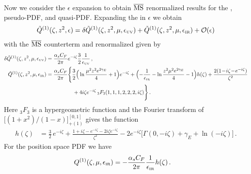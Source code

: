 \begin{widetext}
Now we consider the $\epsilon$ expansion to obtain $\overline{\rm MS}$ renormalized results for the \spcorr, pseudo-PDF, and quasi-PDF. Expanding the \spcorr in $\epsilon$ we obtain
\begin{align}
 \tilde{Q}^{(1)}(\zeta,z^2,\epsilon)=\delta \tilde{Q}^{(1)}(\zeta,z^2,\mu,\epsilon_{\mbox{\tiny UV}})+\tilde{Q}^{(1)}(\zeta,z^2,\mu,\epsilon_{\mbox{\tiny IR}})+{\cal O}(\epsilon)
\end{align}
with the $\overline{\rm MS}$ counterterm and renormalized \spcorr given by
\begin{align} \label{eq:1loopiofferen}
\delta \tilde{Q}^{(1)}(\zeta,z^2,\mu,\epsilon_{\mbox{\tiny UV}})
&= {\alpha_sC_F\over 2\pi}
  e^{-i\zeta} {3\over2}  {1\over \epsilon_{\mbox{\tiny UV}}}
 \,, \\
\tilde{Q}^{(1)}(\zeta,z^2,\mu,\epsilon_{\mbox{\tiny IR}})
&= {\alpha_sC_F\over 2\pi} \Bigg\{
  \frac{3}{2} \Big(\ln{\mu^2 z^2 e^{2\gamma_E} \over 4} +1\Big) e^{-i\zeta}
  + \Bigl( -\frac{1}{ \epsilon_{\mbox{\tiny IR}} } - \ln\frac{z^2\mu^2e^{2\gamma_E}}{4} - 1 \Bigr) h(\zeta)
  + \frac{2(1 \!-\!i\zeta\!-\! e^{-i\zeta})}{\zeta^2}
  \nonumber\\
&\qquad\qquad\quad
  + 4 i \zeta e^{-i\zeta}\, {}_3F_3(1,1,1,2,2,2,i\zeta)
  \Bigg\}
  \,. \nonumber
\end{align}
Here ${}_3F_3$ is a hypergeometric function and the Fourier transform of $\big[(1+x^2)/(1-x)\big]_{+(1)}^{[0,1]}$ gives the function
\begin{align}
  h(\zeta) &=\frac{3}{2}\, e^{-i\zeta}
  + \frac{1+i\zeta-e^{-i\zeta}-2i\zeta e^{-i\zeta}}{\zeta^2}
  - 2 e^{-i\zeta} \big[ \Gamma(0,-i\zeta)\!+\!\gamma_E\!+\!\ln(-i\zeta) \big]
  \,.
\end{align}
For the position space PDF we have
\begin{align}
  Q^{(1)}(\zeta,\mu,\epsilon_{\mbox{\tiny IR}})
  &= -  {\alpha_sC_F\over 2\pi}  \frac{1}{  \epsilon_{\mbox{\tiny IR}} }  h(\zeta) \,.
\end{align}


\end{widetext}
